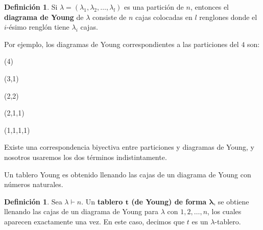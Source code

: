 \documentclass[12pt]{book}
\theoremstyle{definition}
\newtheorem{definition}[theorem]{Definición}
\newcounter{in}
\newcounter{ini}
\begin{document}
\begin{definition}
  Si $\lambda=(\lambda_{1},\lambda_{2},\ldots,\lambda_{l})$ es una
  partición de $n$, entonces el \textbf{diagrama de Young} de $\lambda$
  consiste de $n$ cajas colocadas en $l$ renglones donde el $i$-ésimo
  renglón tiene  $\lambda_{i}$ cajas.
\end{definition}

Por ejemplo, los diagramas de Young correspondientes a las particiones
del $4$ son: 

\begin{center}
  \begin{minipage}[h]{0.2\linewidth}
    \centering {}\bigskip

    (4)
  \end{minipage}
  \begin{minipage}[h]{0.15\linewidth}
    \centering {}\medskip

    (3,1)
  \end{minipage}
  \begin{minipage}[h]{0.15\linewidth}
    \centering {}\medskip

    (2,2)
  \end{minipage}
  \begin{minipage}[h]{0.15\linewidth}
    \centering {}\smallskip

    (2,1,1)
  \end{minipage}
  \begin{minipage}[h]{0.15\linewidth}
    \centering {}\smallskip

    (1,1,1,1)
  \end{minipage}
\end{center}

Existe una correspondencia biyectiva entre particiones y diagramas
de Young, y nosotros usaremos los dos términos indistintamente.

Un tablero Young es obtenido llenando las cajas de un diagrama de
Young con números naturales.

\begin{definition}
  Sea $\lambda\vdash n$. Un \textbf{tablero $\boldsymbol{t}$ (de Young) de forma
    $\boldsymbol{\lambda}$}, se obtiene llenando las cajas de un
  diagrama de Young para $\lambda$ con $1,2,\ldots,n$, los cuales
  aparecen exactamente una vez. En este caso, decimos que $t$ es un
  $\lambda$-tablero.
\end{definition}
\end{document}
